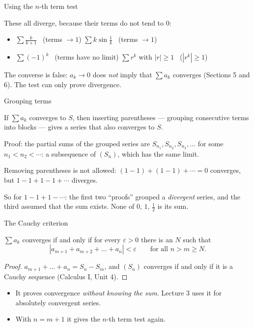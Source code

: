 \documentclass{wosm-slides}
\begin{document}
\begin{frame}{Using the $n$-th term test}
  \begin{example}
    These all diverge, because their terms do not tend to $0$:
    \begin{itemize}
      \item $\sum \frac{k}{k+1}$ \ (terms $\to 1$) \qquad
        $\sum k \sin\frac1k$ \ (terms $\to 1$)
      \item $\sum (-1)^k$ \ (terms have no limit) \qquad
        $\sum r^k$ with $|r| \ge 1$ \ ($|r^k| \ge 1$)
    \end{itemize}
  \end{example}
  \pause
  \begin{warning}
    The converse is false: $a_k \to 0$ does \emph{not} imply that $\sum a_k$ converges
    (Sections 5 and 6). The test can only prove divergence.
  \end{warning}
\end{frame}

\begin{frame}{Grouping terms}
  \begin{theorem}
    If $\sum a_k$ converges to $S$, then inserting parentheses --- grouping
    consecutive terms into blocks --- gives a series that also converges to $S$.
  \end{theorem}
  {\small Proof: the partial sums of the grouped series are
  $S_{n_1}, S_{n_2}, S_{n_3}, \dots$ for some $n_1 < n_2 < \cdots$: a subsequence of $(S_n)$,
  which has the same limit.\par}
  \pause
  \begin{warning}
    Removing parentheses is not allowed:
    $(1 - 1) + (1 - 1) + \cdots = 0$ converges, but $1 - 1 + 1 - 1 + \cdots$ diverges.
  \end{warning}
  \pause
  So for $1 - 1 + 1 - \cdots$: the first two ``proofs'' grouped a \emph{divergent}
  series, and the third assumed that the sum exists. None of $0$, $1$, $\frac12$ is its sum.
\end{frame}

\begin{frame}{The Cauchy criterion}
  \begin{theorem}
    $\sum a_k$ converges if and only if for every $\varepsilon > 0$ there is an $N$ such that
    \[ |a_{m+1} + a_{m+2} + \dots + a_n| < \varepsilon \qquad\text{for all } n > m \ge N . \]
  \end{theorem}
  \begin{proof}
    $a_{m+1} + \dots + a_n = S_n - S_m$, and $(S_n)$ converges if and only if it is a
    Cauchy sequence (Calculus I, Unit 4).
  \end{proof}
  \begin{itemize}
    \item It proves convergence \emph{without knowing the sum}. Lecture 3 uses it for
      absolutely convergent series.
    \item With $n = m + 1$ it gives the $n$-th term test again.
  \end{itemize}
\end{frame}
\end{document}
